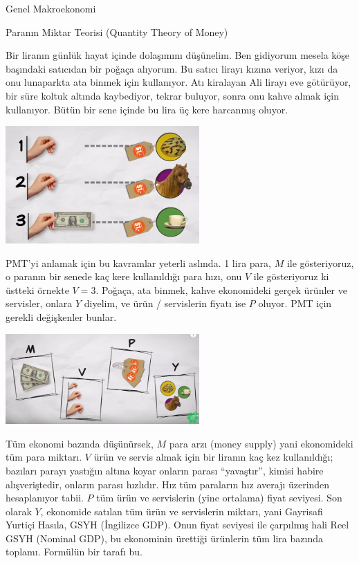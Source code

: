 \documentclass[12pt,fleqn]{article}\usepackage{../../common}
\begin{document}
Genel Makroekonomi

Paranın Miktar Teorisi (Quantity Theory of Money) 

Bir liranın günlük hayat içinde dolaşımını düşünelim. Ben gidiyorum mesela
köşe başındaki satıcıdan bir poğaça alıyorum. Bu satıcı lirayı kızına
veriyor, kızı da onu lunaparkta ata binmek için kullanıyor. Atı kiralayan
Ali lirayı eve götürüyor, bir süre koltuk altında kaybediyor, tekrar
buluyor, sonra onu kahve almak için kullanıyor. Bütün bir sene içinde bu
lira üç kere harcanmış oluyor.

\includegraphics[width=20em]{tser_macro_01.png}

PMT'yi anlamak için bu kavramlar yeterli aslında. 1 lira para, $M$ ile
gösteriyoruz, o paranın bir senede kaç kere kullanıldığı para hızı, onu $V$
ile gösteriyoruz ki üstteki örnekte $V=3$. Poğaça, ata binmek, kahve
ekonomideki gerçek ürünler ve servisler, onlara $Y$ diyelim, ve ürün /
servislerin fiyatı ise $P$ oluyor. PMT için gerekli değişkenler bunlar. 

\includegraphics[width=20em]{tser_macro_02.png}

Tüm ekonomi bazında düşünürsek, $M$ para arzı (money supply) yani
ekonomideki tüm para miktarı. $V$ ürün ve servis almak için bir liranın kaç
kez kullanıldığı; bazıları parayı yastığın altına koyar onların parası
``yavaştır'', kimisi habire alışveriştedir, onların parası hızlıdır. Hız
tüm paraların hız averajı üzerinden hesaplanıyor tabii. $P$ tüm ürün ve
servislerin (yine ortalama) fiyat seviyesi. Son olarak $Y$, ekonomide
satılan tüm ürün ve servislerin miktarı, yani Gayrisafi Yurtiçi Hasıla,
GSYH (İngilizce GDP). Onun fiyat seviyesi ile çarpılmış hali Reel GSYH
(Nominal GDP), bu ekonominin ürettiği ürünlerin tüm lira bazında
toplamı. Formülün bir tarafı bu.
\end{document}
